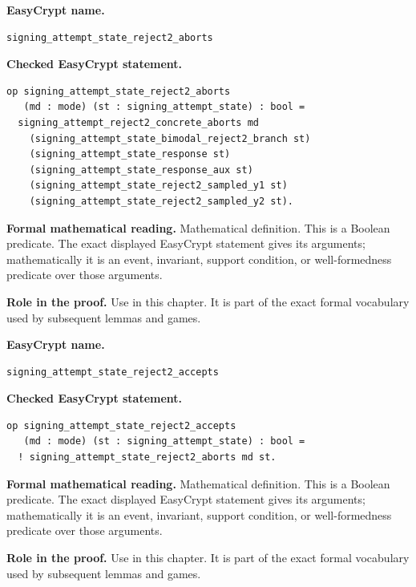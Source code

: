 \begin{formaldefinition}
\noindent\textbf{EasyCrypt name.}
\begin{lstlisting}[language=EasyCrypt,basicstyle=\ttfamily\scriptsize]
signing_attempt_state_reject2_aborts
\end{lstlisting}
\noindent\textbf{Checked EasyCrypt statement.}
\begin{lstlisting}[language=EasyCrypt,basicstyle=\ttfamily\scriptsize]
op signing_attempt_state_reject2_aborts
   (md : mode) (st : signing_attempt_state) : bool =
  signing_attempt_reject2_concrete_aborts md
    (signing_attempt_state_bimodal_reject2_branch st)
    (signing_attempt_state_response st)
    (signing_attempt_state_response_aux st)
    (signing_attempt_state_reject2_sampled_y1 st)
    (signing_attempt_state_reject2_sampled_y2 st).
\end{lstlisting}
\noindent\textbf{Formal mathematical reading.}
Mathematical definition. This is a Boolean predicate.  The exact displayed EasyCrypt statement gives its arguments; mathematically it is an event, invariant, support condition, or well-formedness predicate over those arguments.

\noindent\textbf{Role in the proof.}
Use in this chapter. It is part of the exact formal vocabulary used by subsequent lemmas and games.

\end{formaldefinition}

\begin{formaldefinition}
\noindent\textbf{EasyCrypt name.}
\begin{lstlisting}[language=EasyCrypt,basicstyle=\ttfamily\scriptsize]
signing_attempt_state_reject2_accepts
\end{lstlisting}
\noindent\textbf{Checked EasyCrypt statement.}
\begin{lstlisting}[language=EasyCrypt,basicstyle=\ttfamily\scriptsize]
op signing_attempt_state_reject2_accepts
   (md : mode) (st : signing_attempt_state) : bool =
  ! signing_attempt_state_reject2_aborts md st.
\end{lstlisting}
\noindent\textbf{Formal mathematical reading.}
Mathematical definition. This is a Boolean predicate.  The exact displayed EasyCrypt statement gives its arguments; mathematically it is an event, invariant, support condition, or well-formedness predicate over those arguments.

\noindent\textbf{Role in the proof.}
Use in this chapter. It is part of the exact formal vocabulary used by subsequent lemmas and games.

\end{formaldefinition}

